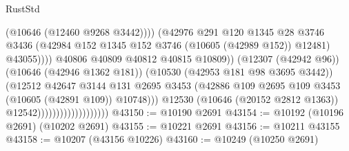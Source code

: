 \begin{lexlean}{RustStd}
\begin{coremodule}
                                                          (@10646 (@12460 @9268 @3442))))
                                                      (@42976
                                                        @291
                                                        @120
                                                        @1345
                                                        @28
                                                        @3746
                                                        @3436
                                                        (@42984
                                                          @152
                                                          @1345
                                                          @152
                                                          @3746
                                                          (@10605 (@42989 @152))
                                                          @12481)
                                                        @43055))))
                                                @40806
                                                @40809
                                                @40812
                                                @40815
                                                @10809))
                                            (@12307 (@42942 @96))
                                            (@10646 (@42946 @1362 @181))
                                            (@10530 (@42953 @181 @98 @3695 @3442))
                                            (@12512
                                              @42647
                                              @3144
                                              @131
                                              @2695
                                              @3453
                                              (@42886
                                                @109
                                                @2695
                                                @109
                                                @3453
                                                (@10605 (@42891 @109))
                                                @10748)))
                                          @12530
                                          (@10646 (@20152 @2812 @1363))
                                          @12542)))))))))))))))))))
@43150 := @10190 @2691
@43154 := @10192 (@10196 @2691) (@10202 @2691)
@43155 := @10221 @2691
@43156 := @10211 @43155
@43158 := @10207 (@43156 @10226)
@43160 := @10249 (@10250 @2691)

\end{coremodule}
\end{lexlean}
